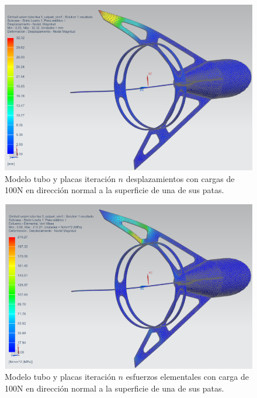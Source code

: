 \begin{figure}[htb]
    \centering
    \includegraphics[height=0.3\pdfpageheight]{fig/fea/patas3.png}
    \caption{Modelo tubo y placas iteración $n$ desplazamientos con cargas de 100N en dirección normal a la superficie de una de sus patas.}
    \label{fig:fea/patas3}
\end{figure}


\begin{figure}[htb]
    \centering
    \includegraphics[height=0.3\pdfpageheight]{fig/fea/patas4.png}
    \caption{Modelo tubo y placas iteración $n$ esfuerzos elementales con carga de 100N en dirección normal a la superficie de una de sus patas.}
    \label{fig:fea/patas4}
\end{figure}

